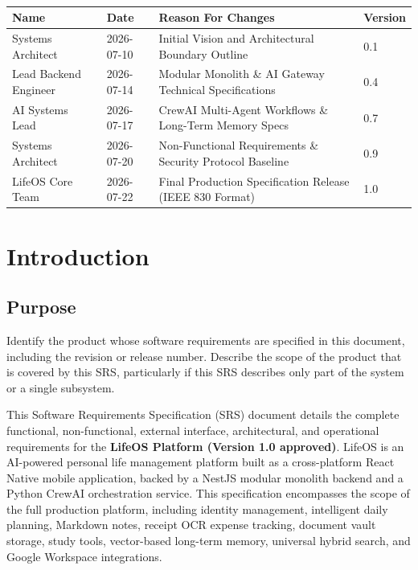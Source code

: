 \documentclass[11pt,a4paper]{article}
\begin{document}
\tableofcontents

\vspace{1cm}

 \\[0.5cm]

\begin{table}[h!]
\centering
\begin{tabularx}{\textwidth}{|X|l|X|l|}
\hline
\textbf{Name} & \textbf{Date} & \textbf{Reason For Changes} & \textbf{Version} \\ \hline
Systems Architect & 2026-07-10 & Initial Vision and Architectural Boundary Outline & 0.1 \\ \hline
Lead Backend Engineer & 2026-07-14 & Modular Monolith \& AI Gateway Technical Specifications & 0.4 \\ \hline
AI Systems Lead & 2026-07-17 & CrewAI Multi-Agent Workflows \& Long-Term Memory Specs & 0.7 \\ \hline
Systems Architect & 2026-07-20 & Non-Functional Requirements \& Security Protocol Baseline & 0.9 \\ \hline
LifeOS Core Team & 2026-07-22 & Final Production Specification Release (IEEE 830 Format) & 1.0 \\ \hline
\end{tabularx}
\end{table}

\newpage
{}
\setcounter{page}{1}

\section{Introduction}

\subsection{Purpose}
Identify the product whose software requirements are specified in this document, including the revision or release number. Describe the scope of the product that is covered by this SRS, particularly if this SRS describes only part of the system or a single subsystem.

This Software Requirements Specification (SRS) document details the complete functional, non-functional, external interface, architectural, and operational requirements for the \textbf{LifeOS Platform (Version 1.0 approved)}. LifeOS is an AI-powered personal life management platform built as a cross-platform React Native mobile application, backed by a NestJS modular monolith backend and a Python CrewAI orchestration service. This specification encompasses the scope of the full production platform, including identity management, intelligent daily planning, Markdown notes, receipt OCR expense tracking, document vault storage, study tools, vector-based long-term memory, universal hybrid search, and Google Workspace integrations.
\end{document}
